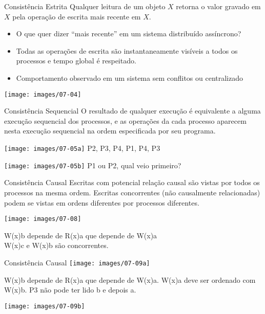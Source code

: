 \begin{frame}{Consistência Estrita}
	Qualquer leitura de um objeto $X$ retorna o valor gravado em $X$ pela operação de escrita mais recente em $X$.

	\begin{itemize}
	\item O que quer dizer ``mais recente'' em um sistema distribuído assíncrono?
	\item Todas as operações de escrita são instantaneamente visíveis a todos os processos e \alert{tempo global} é respeitado.
	\item Comportamento observado em um sistema sem conflitos ou centralizado
\end{itemize}

	\texttt{[image: images/07-04]}

\end{frame}


\begin{frame}{Consistência Sequencial}
O resultado de qualquer execução é equivalente a alguma execução sequencial dos processos, e as operações da cada processo aparecem nesta execução sequencial na ordem especificada por seu programa.

\pause \texttt{[image: images/07-05a]}
\pause P2, P3, P4, P1, P4, P3

\pause \texttt{[image: images/07-05b]}
\pause P1 ou P2, qual veio primeiro?
\end{frame}

\begin{frame}{Consistência Causal}
Escritas com potencial relação causal são vistas por todos os processos na mesma ordem. Escritas concorrentes (não causalmente relacionadas) podem se vistas em ordens diferentes por processos diferentes.


\texttt{[image: images/07-08]}

\pause W(x)b depende de R(x)a que depende de W(x)a\\
\pause W(x)c e W(x)b são concorrentes.
\end{frame}


\begin{frame}{Consistência Causal}
\texttt{[image: images/07-09a]}

\pause W(x)b depende de R(x)a que depende de W(x)a. W(x)a deve ser ordenado com W(x)b. P3 não pode ter lido b e depois a.

\pause \texttt{[image: images/07-09b]}
\end{frame}


